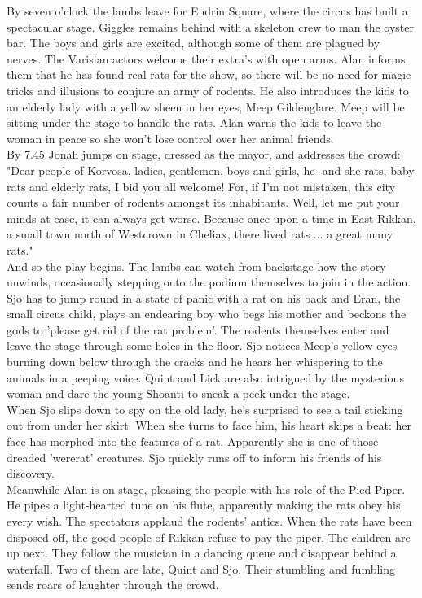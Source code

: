 By seven o'clock the lambs leave for Endrin Square, where the circus has built a spectacular stage. Giggles remains behind with a skeleton crew to man the oyster bar. The boys and girls are excited, although some of them are plagued by nerves. The Varisian actors welcome their extra's with open arms. Alan informs them that he has found real rats for the show, so there will be no need for magic tricks and illusions to conjure an army of rodents. He also introduces the kids to an elderly lady with a yellow sheen in her eyes, Meep Gildenglare. Meep will be sitting under the stage to handle the rats. Alan warns the kids to leave the woman in peace so she won't lose control over her animal friends.\\

By 7.45 Jonah jumps on stage, dressed as the mayor, and addresses the crowd: "Dear people of Korvosa, ladies, gentlemen, boys and girls, he- and she-rats, baby rats and elderly rats, I bid you all welcome! For, if I'm not mistaken, this city counts a fair number of rodents amongst its inhabitants. Well, let me put your minds at ease, it can always get worse. Because once upon a time in East-Rikkan, a small town north of Westcrown in Cheliax, there lived rats ... a great many rats."\\

And so the play begins. The lambs can watch from backstage how the story unwinds, occasionally stepping onto the podium themselves to join in the action. Sjo has to jump round in a state of panic with a rat on his back and Eran, the small circus child, plays an endearing boy who begs his mother and beckons the gods to 'please get rid of the rat problem'. The rodents themselves enter and leave the stage through some holes in the floor. Sjo notices Meep's yellow eyes burning down below through the cracks and he hears her whispering to the animals in a peeping voice. Quint and Lick are also intrigued by the mysterious woman and dare the young Shoanti to sneak a peek under the stage.\\

When Sjo slips down to spy on the old lady, he's surprised to see a tail sticking out from under her skirt. When she turns to face him, his heart skips a beat: her face has morphed into the features of a rat. Apparently she is one of those dreaded 'wererat' creatures. Sjo quickly runs off to inform his friends of his discovery.\\

Meanwhile Alan is on stage, pleasing the people with his role of the Pied Piper. He pipes a light-hearted tune on his flute, apparently making the rats obey his every wish. The spectators applaud the rodents' antics. When the rats have been disposed off, the good people of Rikkan refuse to pay the piper. The children are up next. They follow the musician in a dancing queue and disappear behind a waterfall. Two of them are late, Quint and Sjo. Their stumbling and fumbling sends roars of laughter through the crowd.\\

